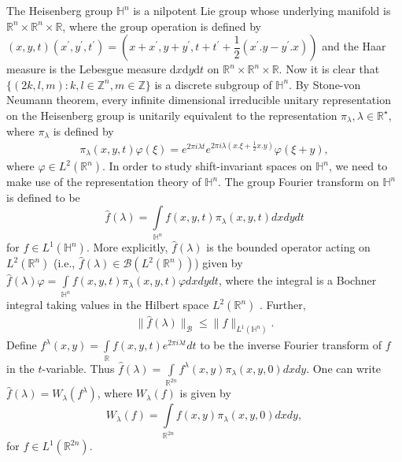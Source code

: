 \documentclass[a4paper,12pt,reqno]{amsart}
\theoremstyle{plain}
\numberwithin{equation}{section}
\theoremstyle{definition}
\newcommand{\ds}{\displaystyle}
\begin{document}
The Heisenberg group $\mathbb{H}^n$ is a nilpotent Lie group whose underlying manifold is $\mathbb{R}^n\times\mathbb{R}^{n}\times\mathbb{R}$, where the group operation is defined by $(x,y,t)(x^{\prime},y^{\prime},t^{\prime})=(x+x^{\prime},y+y^{\prime},t+t^{\prime}+\dfrac{1}{2}(x^{\prime}.y-y^{\prime}.x))$ and the Haar measure is the Lebesgue measure  $\mathrm{d}x\mathrm{d}y\mathrm{d}t$ on $\mathbb{R}^n\times\mathbb{R}^{n}\times\mathbb{R}$. Now it is clear that $\{(2k,l,m):k,l\in\mathbb{Z}^{n},m\in\mathbb{Z}\}$ is a discrete subgroup of $\mathbb{H}^{n}$. By Stone-von Neumann theorem, every infinite dimensional irreducible unitary representation on the Heisenberg group is unitarily equivalent to the representation $\pi_{\lambda}, \lambda\in \mathbb{R}^{\star}$, where $\pi_{\lambda}$ is defined by
\begin{eqnarray*}
\pi_{\lambda}(x,y,t)\varphi(\xi)=e^{2\pi i\lambda t}e^{2\pi i\lambda(x.\xi+\frac{1}{2}x.y)}\varphi(\xi+y),
\end{eqnarray*}
where $\varphi\in L^{2}(\mathbb{R}^{n})$.
In order to study shift-invariant spaces on $\mathbb{H}^n$, we need to make use of the representation theory of $\mathbb{H}^n$. The group Fourier transform on $\mathbb{H}^n$ is defined to be $$\widehat{f}(\lambda)=\int\limits_{\mathbb{H}^n}f(x,y,t)\pi_\lambda(x,y,t)dxdydt$$ for $f\in L^{1}(\mathbb{H}^n)$. More explicitly, $\widehat{f}(\lambda)$ is the bounded operator acting on $L^{2}(\mathbb{R}^{n})$ (i.e., $\widehat{f}(\lambda)\in \mathcal{B}(L^{2}(\mathbb{R}^{n}))$) given by $\widehat{f}(\lambda)\varphi=\ds\int\limits_{\mathbb{H}^n}f(x,y,t)\pi_\lambda(x,y,t)\varphi dxdy dt$, where the integral is a Bochner integral taking values in the Hilbert space $L^{2}(\mathbb{R}^{n})$ . Further,
\begin{eqnarray*}
\|\widehat{f}(\lambda)\|_{\mathcal{B}}\leq \|f\|_{L^{1}(\mathbb{H}^{n})}.
\end{eqnarray*}
Define $f^\lambda(x,y)=\ds\int\limits_{\mathbb{R}}f(x,y,t)e^{2\pi i\lambda t}dt$ to be the inverse Fourier transform of $f$ in the $t$-variable. Thus $\widehat{f}(\lambda)=\ds\int\limits_{\mathbb{R}^{2n}}f^\lambda(x,y)\pi_\lambda(x,y,0)dxdy$. One can write $\widehat{f}(\lambda)=W_\lambda(f^\lambda)$, where $W_{\lambda}(f)$ is given by
$$W_\lambda(f)=\int\limits_{\mathbb{R}^{2n}}f(x,y)\pi_\lambda(x,y,0)dxdy,$$
for $f\in L^{1}(\mathbb{R}^{2n})$.
\end{document}
